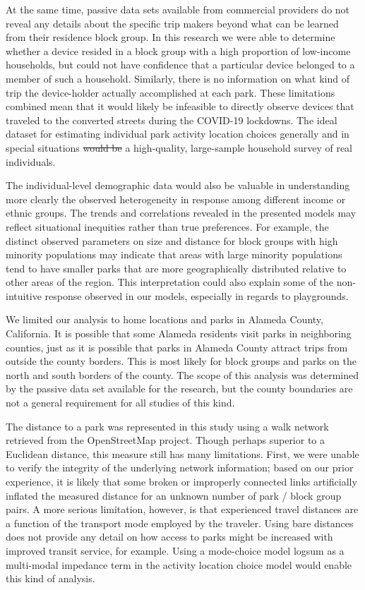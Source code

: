 \documentclass[3p, authoryear, review, doubleblind]{elsarticle} %
\providecommand{\DIFaddtex}[1]{{\protect\color{blue}\uwave{#1}}} %
\providecommand{\DIFdeltex}[1]{{\protect\color{red}\sout{#1}}}                      %
\providecommand{\DIFaddbegin}{} %
\providecommand{\DIFaddend}{} %
\providecommand{\DIFdelbegin}{} %
\providecommand{\DIFdelend}{} %
\providecommand{\DIFadd}[1]{\texorpdfstring{\DIFaddtex{#1}}{#1}} %
\providecommand{\DIFdel}[1]{\texorpdfstring{\DIFdeltex{#1}}{}} %
\newcommand{\DIFscaledelfig}{0.5}
\newlength{\DIFdelgraphicswidth} %
\newlength{\DIFdelgraphicsheight} %
\newcommand{\DIFaddincludegraphics}[2][]{{\color{blue}\fbox{\DIFOincludegraphics[#1]{#2}}}} %
\newcommand{\DIFdelincludegraphics}[2][]{%
\sbox{\DIFdelgraphicsbox}{\DIFOincludegraphics[#1]{#2}}%
\settoboxwidth{\DIFdelgraphicswidth}{\DIFdelgraphicsbox} %
\settoboxtotalheight{\DIFdelgraphicsheight}{\DIFdelgraphicsbox} %
\scalebox{\DIFscaledelfig}{%
\parbox[b]{\DIFdelgraphicswidth}{\usebox{\DIFdelgraphicsbox}\\[-\baselineskip] \rule{\DIFdelgraphicswidth}{0em}}\llap{\resizebox{\DIFdelgraphicswidth}{\DIFdelgraphicsheight}{%
\setlength{\unitlength}{\DIFdelgraphicswidth}%
\begin{picture}(1,1)%
\thicklines\linethickness{2pt} %
{\color[rgb]{1,0,0}\put(0,0){\framebox(1,1){}}}%
{\color[rgb]{1,0,0}\put(0,0){\line( 1,1){1}}}%
{\color[rgb]{1,0,0}\put(0,1){\line(1,-1){1}}}%
\end{picture}%
}\hspace*{3pt}}} %
} %
\DeclareRobustCommand{\DIFaddbegin}{\DIFOaddbegin \let\includegraphics\DIFaddincludegraphics} %
\DeclareRobustCommand{\DIFaddend}{\DIFOaddend \let\includegraphics\DIFOincludegraphics} %
\DeclareRobustCommand{\DIFdelbegin}{\DIFOdelbegin \let\includegraphics\DIFdelincludegraphics} %
\DeclareRobustCommand{\DIFdelend}{\DIFOaddend \let\includegraphics\DIFOincludegraphics} %
\begin{document}
At the same time, passive data sets available from commercial providers do not
reveal any details about the specific trip makers beyond what can be learned
from their residence block group. In this research we were able to determine
whether a device resided in a block group with a high proportion of low-income
households, but could not have confidence that a particular device belonged to a
member of such a household. Similarly, there is no information on what kind of
trip the device-holder actually accomplished at each park. These limitations
combined mean that it would likely be infeasible to directly observe devices
that traveled to the converted streets during the COVID-19 lockdowns. The ideal
dataset for estimating individual park activity location choices generally and
in special situations \DIFdelbegin \DIFdel{would be }\DIFdelend \DIFaddbegin \DIFadd{remains }\DIFaddend a high-quality, large-sample household survey of
real individuals.

The individual-level demographic data would also be valuable in understanding
more clearly the observed heterogeneity in response among different income or
ethnic groups. The trends and correlations revealed in the presented models may
reflect situational inequities rather than true preferences. For example, the
distinct observed parameters on size and distance for block groups with high
minority populations may indicate that areas with large minority populations
tend to have smaller parks that are more geographically distributed relative to
other areas of the region. This interpretation could also explain some of the
non-intuitive response observed in our models, especially in regards to
playgrounds.

We limited our analysis to home locations and parks in Alameda County,
California. It is possible that some Alameda residents visit parks in
neighboring counties, just as it is possible that parks in Alameda County
attract trips from outside the county borders. This is most likely for block
groups and parks on the north and south borders of the county. The scope of this
analysis was determined by the passive data set available for the research, but
the county boundaries are not a general requirement for all studies of this
kind.

The distance to a park was represented in this study using a walk network
retrieved from the OpenStreetMap project. Though perhaps superior to a Euclidean
distance, this measure still has many limitations. First, we were unable to
verify the integrity of the underlying network information; based on our prior
experience, it is likely that some broken or improperly connected links
artificially inflated the measured distance for an unknown number of park /
block group pairs. A more serious limitation, however, is that experienced
travel distances are a function of the transport mode employed by the traveler.
Using bare distances does not provide any detail on how access to parks might be
increased with improved transit service, for example. Using a mode-choice model
logsum as a multi-modal impedance term in the activity location choice model
would enable this kind of analysis.
\end{document}
